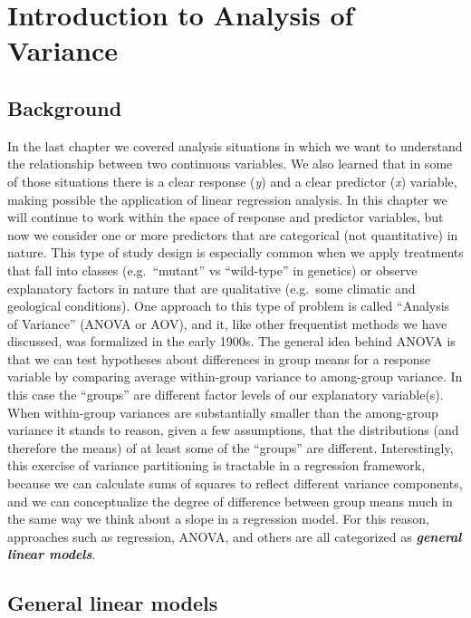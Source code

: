 \documentclass[
]{book}
\begin{document}
\hypertarget{introduction-to-analysis-of-variance}{%
\chapter{Introduction to Analysis of Variance}\label{introduction-to-analysis-of-variance}}

\hypertarget{background-4}{%
\section{Background}\label{background-4}}

In the last chapter we covered analysis situations in which we want to understand the relationship between two continuous variables. We also learned that in some of those situations there is a clear response (\emph{y}) and a clear predictor (\emph{x}) variable, making possible the application of linear regression analysis. In this chapter we will continue to work within the space of response and predictor variables, but now we consider one or more predictors that are categorical (not quantitative) in nature. This type of study design is especially common when we apply treatments that fall into classes (e.g.~``mutant'' vs ``wild-type'' in genetics) or observe explanatory factors in nature that are qualitative (e.g.~some climatic and geological conditions). One approach to this type of problem is called ``Analysis of Variance'' (ANOVA or AOV), and it, like other frequentist methods we have discussed, was formalized in the early 1900s. The general idea behind ANOVA is that we can test hypotheses about differences in group means for a response variable by comparing average within-group variance to among-group variance. In this case the ``groups'' are different factor levels of our explanatory variable(s). When within-group variances are substantially smaller than the among-group variance it stands to reason, given a few assumptions, that the distributions (and therefore the means) of at least some of the ``groups'' are different. Interestingly, this exercise of variance partitioning is tractable in a regression framework, because we can calculate sums of squares to reflect different variance components, and we can conceptualize the degree of difference between group means much in the same way we think about a slope in a regression model. For this reason, approaches such as regression, ANOVA, and others are all categorized as \textbf{\emph{general linear models}}.

\hypertarget{general-linear-models}{%
\section{General linear models}\label{general-linear-models}}
\end{document}
